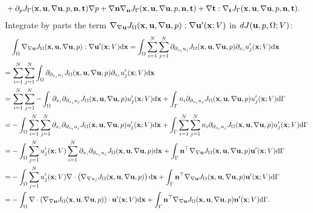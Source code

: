 \documentclass[oneside]{book}
\numberwithin{equation}{section}
\begin{document}
\begin{enumerate}[leftmargin=0in]
\begin{align*}
        &+ \partial_pJ_\Gamma({\bf x},{\bf u},\nabla{\bf u},p,{\bf n},{\bf t})\nabla p + \nabla{\bf n}\nabla_{\bf n}J_\Gamma({\bf x},{\bf u},\nabla{\bf u},p,{\bf n},{\bf t}) + \nabla{\bf t}:\nabla_{\bf t}J_\Gamma({\bf x},{\bf u},\nabla{\bf u},p,{\bf n},{\bf t}).
    \end{align*}
    Integrate by parts the term $\nabla_{\nabla{\bf u}}J_\Omega({\bf x},{\bf u},\nabla{\bf u},p):\nabla{\bf u}'({\bf x};V)$ in $dJ({\bf u},p,\Omega;V)$:
    \begin{align*}
        &\int_\Omega \nabla_{\nabla{\bf u}}J_\Omega({\bf x},{\bf u},\nabla{\bf u},p):\nabla{\bf u}'({\bf x};V){\rm d}{\bf x} = \int_\Omega \sum_{i=1}^N\sum_{j=1}^N \partial_{\partial_{x_i}u_j}J_\Omega({\bf x},{\bf u},\nabla{\bf u},p)\partial_{x_i}u_j'({\bf x};V){\rm d}{\bf x}\\
        =&\, \sum_{i=1}^N\sum_{j=1}^N \int_\Omega \partial_{\partial_{x_i}u_j}J_\Omega({\bf x},{\bf u},\nabla{\bf u},p)\partial_{x_i}u_j'({\bf x};V){\rm d}{\bf x}\\
        =&\, \sum_{i=1}^N\sum_{j=1}^N -\int_\Omega \partial_{x_i}\partial_{\partial_{x_i}u_j}J_\Omega({\bf x},{\bf u},\nabla{\bf u},p)u_j'({\bf x};V){\rm d}{\bf x} + \int_\Gamma n_i\partial_{\partial_{x_i}u_j}J_\Omega({\bf x},{\bf u},\nabla{\bf u},p)u_j'({\bf x};V){\rm d}\Gamma\\
        =&-\int_\Omega \sum_{i=1}^N\sum_{j=1}^N \partial_{x_i}\partial_{\partial_{x_i}u_j}J_\Omega({\bf x},{\bf u},\nabla{\bf u},p)u_j'({\bf x};V){\rm d}{\bf x} + \int_\Gamma \sum_{i=1}^N\sum_{j=1}^N n_i\partial_{\partial_{x_i}u_j}J_\Omega({\bf x},{\bf u},\nabla{\bf u},p)u_j'({\bf x};V){\rm d}\Gamma\\
        =&-\int_\Omega \sum_{j=1}^N u_j'({\bf x};V)\sum_{i=1}^N \partial_{x_i}\partial_{\partial_{x_i}u_j}J_\Omega({\bf x},{\bf u},\nabla{\bf u},p){\rm d}{\bf x} + \int_\Gamma {\bf n}^\top\nabla_{\nabla{\bf u}}J_\Omega({\bf x},{\bf u},\nabla{\bf u},p){\bf u}'({\bf x};V){\rm d}\Gamma\\
        =&-\int_\Omega \sum_{j=1}^N u_j'({\bf x};V)\nabla\cdot\left(\nabla_{\nabla u_j}J_\Omega({\bf x},{\bf u},\nabla{\bf u},p)\right){\rm d}{\bf x} + \int_\Gamma {\bf n}^\top\nabla_{\nabla{\bf u}}J_\Omega({\bf x},{\bf u},\nabla{\bf u},p){\bf u}'({\bf x};V){\rm d}\Gamma\\
        =&-\int_\Omega \nabla\cdot\left(\nabla_{\nabla{\bf u}}J_\Omega({\bf x},{\bf u},\nabla{\bf u},p)\right)\cdot{\bf u}'({\bf x};V){\rm d}{\bf x} + \int_\Gamma
        {\bf n}^\top\nabla_{\nabla{\bf u}}J_\Omega({\bf x},{\bf u},\nabla{\bf u},p){\bf u}'({\bf x};V){\rm d}\Gamma.

\end{align*}
\end{enumerate}
\end{document}
